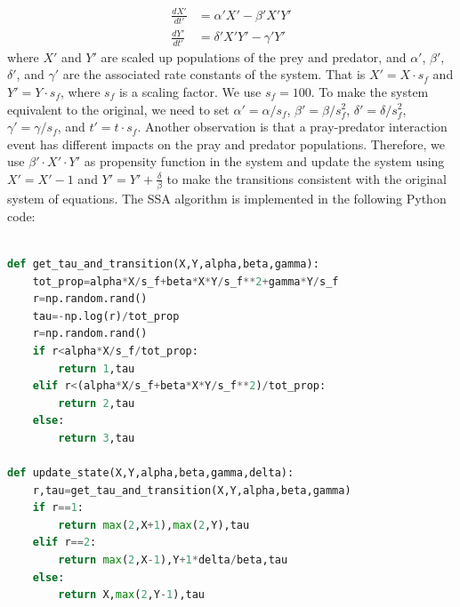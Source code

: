 \documentclass[12pt]{article}
\begin{document}
\begin{align}
\frac{dX'}{dt'} &= \alpha' X' - \beta' X'Y' \\
\frac{dY'}{dt'} &= \delta' X'Y' - \gamma' Y'
\label{eq:LV2}
\end{align}
where $X'$ and $Y'$ are scaled up populations of the prey and predator, and $\alpha'$, $\beta'$, $\delta'$, and $\gamma'$ are the associated rate constants of the system.  That is $X'=X \cdot s_f$ and $Y'=Y \cdot s_f$, where $s_f$ is a scaling factor.  We use $s_f=100$.  To make the system equivalent to the original, we need to set $\alpha'=\alpha/s_f$, $\beta'=\beta/s_f^2$, $\delta'=\delta/s_f^2$, $\gamma'=\gamma/s_f$, and $t'=t\cdot s_f$. Another observation is that a pray-predator interaction event has different impacts on the pray and predator populations. Therefore, we use $\beta' \cdot X' \cdot Y'$ as propensity function in the system and update the system using $X'=X'-1$ and $Y'=Y'+\frac {\delta} {\beta}$ to make the transitions consistent with the original system of equations.  The SSA algorithm is implemented in the following Python code:

\begin{lstlisting}[language=Python]

def get_tau_and_transition(X,Y,alpha,beta,gamma):
    tot_prop=alpha*X/s_f+beta*X*Y/s_f**2+gamma*Y/s_f
    r=np.random.rand()
    tau=-np.log(r)/tot_prop
    r=np.random.rand()
    if r<alpha*X/s_f/tot_prop:
        return 1,tau
    elif r<(alpha*X/s_f+beta*X*Y/s_f**2)/tot_prop:
        return 2,tau
    else:
        return 3,tau
    
def update_state(X,Y,alpha,beta,gamma,delta):
    r,tau=get_tau_and_transition(X,Y,alpha,beta,gamma)
    if r==1:
        return max(2,X+1),max(2,Y),tau
    elif r==2:
        return max(2,X-1),Y+1*delta/beta,tau
    else:
        return X,max(2,Y-1),tau
\end{lstlisting}
\end{document}
